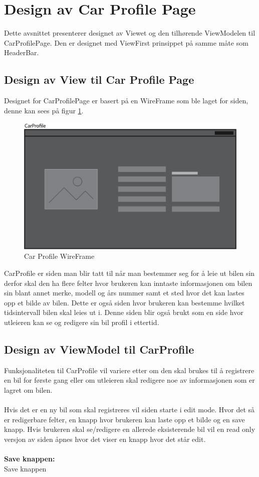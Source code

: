 \documentclass[SoftwareDesign/SoftwareDesign_main.tex]{subfiles}
\begin{document}
\section{Design av Car Profile Page}
Dette avsnittet presenterer designet av Viewet og den tilhørende ViewModelen til CarProfilePage. Den er designet med ViewFirst prinsippet på samme måte som HeaderBar.
\subsection{Design av View til Car Profile Page}
Designet for CarProfilePage er basert på en WireFrame som ble laget for siden, denne kan sees på figur \ref{fig:CarProfileWireFrame}.


\begin{figure}[H]
    \centering
    \includegraphics[width=\textwidth]{SoftwareDesign/MVVMDesigns/Graphics/CarProfileWireFrame.png}
    \caption{Car Profile WireFrame}
    \label{fig:CarProfileWireFrame}
\end{figure}

CarProfile er siden man blir tatt til når man bestemmer seg for å leie ut bilen sin derfor skal den ha flere felter hvor brukeren kan inntaste informasjonen om bilen sin blant annet merke, modell og års nummer samt et sted hvor det kan lastes opp et bilde av bilen. Dette er også siden hvor brukeren kan bestemme hvilket tidsintervall bilen skal leies ut i. Denne siden blir også brukt som en side hvor utleieren kan se og redigere sin bil profil i ettertid.

\subsection{Design av ViewModel til CarProfile}
Funksjonaliteten til CarProfile vil variere etter om den skal brukes til å registrere en bil for første gang eller om utleieren skal redigere noe av informasjonen som er lagret om bilen.
\\
\\
Hvis det er en ny bil som skal registreres vil siden starte i edit mode. Hvor det så er redigerbare felter, en knapp hvor brukeren kan laste opp et bilde og en save knapp. Hvis brukeren skal se/redigere en allerede eksisterende bil vil en read only versjon av siden åpnes hvor det viser en knapp hvor det står edit.
\\
\\
\textbf{Save knappen:}\\
\indent Save knappen 
\end{document}
